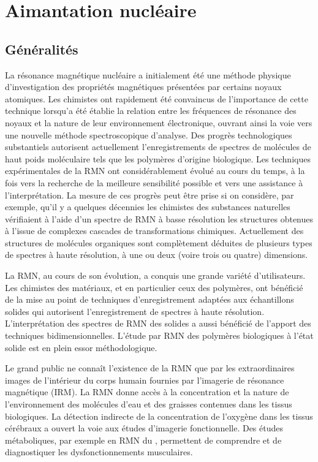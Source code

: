 \chapter[Introduction]{Aimantation nucléaire}
\label{chap:intro}

\section{Généralités}
La résonance magnétique nucléaire a initialement été une méthode physique
d'investigation des propriétés magnétiques présentées par certains noyaux atomiques.
Les chimistes ont rapidement été convaincus de l'importance de cette technique 
lorsqu'a été établie la relation entre les fréquences de résonance des noyaux 
et la nature de leur environnement électronique, ouvrant
ainsi la voie vers une nouvelle méthode spectroscopique d'analyse.
Des progrès technologiques substantiels autorisent actuellement l'enregistrements de
spectres de molécules de haut poids moléculaire tels que les polymères d'origine
biologique.
Les techniques expérimentales de la RMN ont considérablement évolué au cours
du temps, à la fois vers la recherche de la meilleure sensibilité possible
et vers une assistance à l'interprétation.
La mesure de ces progrès peut être prise si on considère, par exemple, 
qu'il y a quelques décennies les chimistes des substances naturelles vérifiaient 
à l'aide d'un spectre de RMN à basse résolution les structures obtenues à l'issue de
complexes cascades de transformations chimiques.
Actuellement des structures de molécules organiques sont complètement déduites de
plusieurs types de spectres à haute résolution, 
à une ou deux (voire trois ou quatre) dimensions.

La RMN, au cours de son évolution, a conquis une grande variété d'utilisateurs.
Les chimistes des matériaux, et en particulier ceux des polymères, ont bénéficié de
la mise au point de techniques d'enregistrement adaptées aux échantillons solides qui
autorisent l'enregistrement de spectres à haute résolution.
L'interprétation des spectres de RMN des solides a aussi bénéficié de l'apport des
techniques bidimensionnelles.
L'étude par RMN des polymères biologiques à l'état solide est en plein essor méthodologique.

Le grand public ne connaît l'existence de la RMN que par les extraordinaires
images de l'intérieur du corps humain fournies par l'imagerie de résonance magnétique (IRM).
La RMN donne accès à
la concentration et la nature de l'environnement des molécules d'eau et des graisses
contenues dans les tissus biologiques.
La détection indirecte de la concentration de l'oxygène dans les 
tissus cérébraux a ouvert la voie
aux études d'imagerie fonctionnelle.
Des études métaboliques, par exemple en RMN du \phos, permettent de comprendre
et de diagnostiquer les dysfonctionnements musculaires.

